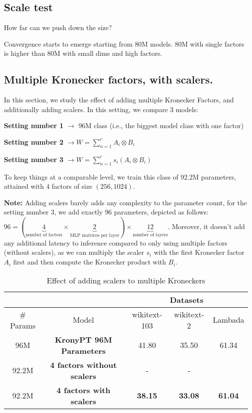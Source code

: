 \documentclass{article}
\begin{document}
{\subsection{Scale test}%
\label{sub:Scale test}
How far can we push down the size? 

Convergence starts to emerge starting from 80M models.   80M with single factors is higher than 80M with small dims and high factors.

\subsection{Multiple Kronecker factors, with scalers.}%
\label{sub:Multiple Kronecker factors, with scalers.}

In this section, we study the effect of adding multiple Kronecker Factors, and additionally adding scalers. In this setting, we compare 3 models:

\textbf{Setting number 1} $\rightarrow$ 96M class (i.e., the biggest model class with one factor)

\textbf{Setting number 2} $\rightarrow W = \sum_{n=1}^{r} A_i \otimes B_i $ 

\textbf{Setting number 3} $\rightarrow W  = \sum_{n=1}^{r} s_i (A_i \otimes B_i)$

To keep things at a comparable level, we train this class of 92.2M parameters, attained with $4$ factors of size $(256, 1024)$. 


\textbf{Note:} Adding scalers barely adds any complexity to the parameter count, for the setting number 3, we add exactly $96$ parameters, depicted as follows: $96 = (\underbrace{4}_{\text{number of factors}} \times \underbrace{2}_{\text{MLP matrices per layer}}) \times \underbrace{12}_{\text{number of layers}}$. Moreover, it doesn't add any additional latency to inference compared to only using multiple factors (without scalers), as we can multiply the scaler $s_i$ with the first Kronecker factor $A_i$ first and then compute the Kronecker product with $B_i$.

\begin{table}[h]
\centering
\begin{tabular}{|c|c|c|c|c|}
\hline
 & & \multicolumn{3}{c|}{Datasets} \\ \hline
\# Params &  Model            & wikitext-103 & wikitext-2 & Lambada \\ \hline
96M       & \textbf{KronyPT 96M Parameters}  & 41.80        & 35.50      & 61.34         \\ \hline
92.2M     & \textbf{4 factors without scalers} & -            & -          &       \\ \hline
92.2M     & \textbf{4 factors with scalers}  &  \textbf{38.15}   & \textbf{33.08}      & \textbf{61.04} \\ \hline
\end{tabular}
\caption{Effect of adding scalers to multiple Kroneckers}


\end{table}}
\end{document}
